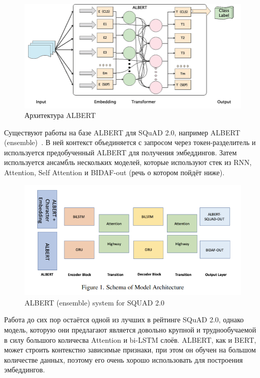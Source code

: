 \documentclass{article}
\begin{document}
\begin{figure}[!ht]
    \centering
    \includegraphics[width=150mm]{../figures/ALBERT.png}
    \caption{Архитектура ALBERT}
    \label{fig:albert}
\end{figure}

Существуют работы на базе ALBERT для SQuAD 2.0, например ALBERT (ensemble)~\cite{ALBERTsquad}. В ней контекст объединяется с запросом через токен-разделитель и используется предобученный ALBERT для получения эмбеддингов. Затем используется ансамбль нескольких моделей, которые используют стек из RNN, Attention, Self Attention и BIDAF-out (речь о котором пойдёт ниже).

\begin{figure}[!ht]
    \centering
    \includegraphics[width=150mm]{../figures/ALBERTsquad.png}
    \caption{ALBERT (ensemble) system for SQUAD 2.0}
    \label{fig:albertsquad}
\end{figure}

Работа до сих пор остаётся одной из лучших в рейтинге SQuAD 2.0, однако модель, которую они предлагают является довольно крупной и труднообучаемой в силу большого количесва Attention и bi-LSTM слоёв.
ALBERT, как и BERT, может строить контекстно зависимые признаки, при этом он обучен на большом количестве данных, поэтому его очень хорошо использовать для построения эмбеддингов.
\end{document}
